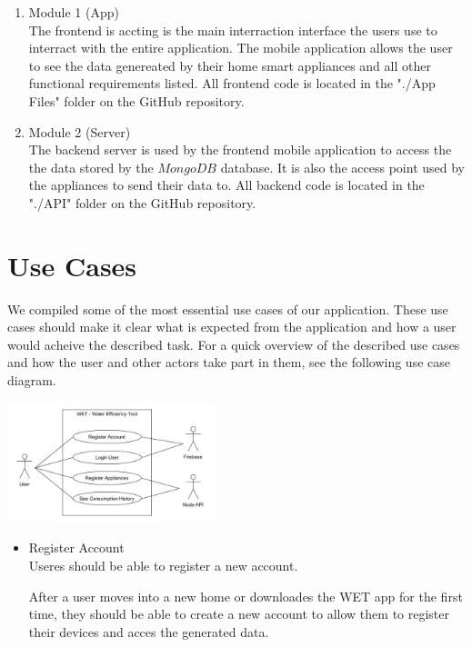 \documentclass[10pt]{article}
\begin{document}
\begin{multicols*}{2}
\begin{enumerate}
  \item {Module 1 (App)} \\
  The frontend is accting is the main interraction interface the users use to interract with the entire application. The mobile application allows the user to see the data genereated by their home smart appliances and all other functional requirements listed.
  All frontend code is located in the "./App Files" folder on the GitHub repository.
  \item {Module 2 (Server)} \\
  The backend server is used by the frontend mobile application to access the the data stored by the $MongoDB$ database. It is also the access point used by the appliances to send their data to.
  All backend code is located in the "./API" folder on the GitHub repository.
\end{enumerate}

\clearpage

\section{Use Cases}

We compiled some of the most essential use cases of our application. These use cases should make it clear what is expected from the application and how a user would acheive the described task.
For a quick overview of the described use cases and how the user and other actors take part in them, see the following use case diagram.

\begin{center}
  \includegraphics[max width=6cm]{uml/usecase_diagram}
\end{center}

\begin{itemize}
  \item {Register Account} \\
  Useres should be able to register a new account.
  
  After a user moves into a new home or downloades the WET app for the first time, they should be able to create a new account to allow them to register their devices and acces the generated data.
 

\end{itemize}
\end{multicols*}
\end{document}
